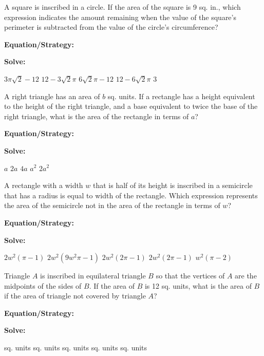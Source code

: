 \vfill
\newpage
\begin{multicols*}{2}
\begin{outline}[enumerate]
\medium

\1 A square is inscribed in a circle. If the area of the square is 9 sq. in., which expression indicates the amount remaining when the value of the square's perimeter is subtracted from the value of the circle's circumference?

\bigskip
\textbf{Equation/Strategy:} \hrulefill

\bigskip
\textbf{Solve:}

\vfill
\2 $3\pi\sqrt{2}-12$
\2 $12-3\sqrt{2}\pi$
\2 $6\sqrt{2}\pi-12$
\2 $12-6\sqrt{2}\pi$
\2 $3$

\midline

\1 A right triangle has an area of $b$ sq. units. If a rectangle has a height equivalent to the height of the right triangle, and a base equivalent to twice the base of the right triangle, what is the area of the rectangle in terms of $a$?

\bigskip
\textbf{Equation/Strategy:} \hrulefill

\bigskip
\textbf{Solve:}

\vfill
\2 $a$
\2 $2a$
\2 $4a$
\2 $a^2$
\2 $2a^2$

\columnbreak
\advanced

\1 A rectangle with a width $w$ that is half of its height is inscribed in a semicircle that has a radius is equal to width of the rectangle. Which expression represents the area of the semicircle not in the area of the rectangle in terms of $w$?

\bigskip
\textbf{Equation/Strategy:} \hrulefill

\bigskip
\textbf{Solve:}

\vfill
\2 $2w^2(\pi-1)$
\2 $2w^2(9w^2\pi-1)$
\2 $2w^2(2\pi-1)$
\2 $2w^2(2\pi-1)$
\2 $w^2(\pi-2)$

\midline

\1 Triangle $A$ is inscribed in equilateral triangle $B$ so that the vertices of $A$ are the midpoints of the sides of $B$. If the area of $B$ is 12 sq. units, what is the area of $B$ if the area of triangle not covered by triangle $A$?

\bigskip
\textbf{Equation/Strategy:}

\bigskip
\textbf{Solve:}

\vfill
{} sq. units
 sq. units
 sq. units
 sq. units
 sq. units
\end{outline}
\end{multicols*}